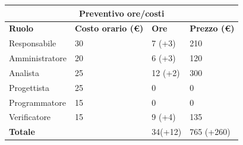 \documentclass[a4paper, 12pt]{article}
\begin{document}
\begin{center}
	\begin{tabularx}{\textwidth}{|X|X|X|X|}
		\hline
		\multicolumn{4}{|c|}{\textbf{Preventivo ore/costi}}                                      \\
		\hline
		\hline
		\textbf{Ruolo}  & \textbf{Costo orario (\euro)} & \textbf{Ore} & \textbf{Prezzo (\euro)} \\
		\hline
		Responsabile    & 30                            & 7 (+3)            & 210                     \\
		\hline
		Amministratore  & 20                            & 6 (+3)           & 120                     \\
		\hline
		Analista        & 25                            & 12 (+2)          & 300                     \\
		\hline
		Progettista     & 25                            & 0            & 0                       \\
		\hline
		Programmatore   & 15                            & 0            & 0                       \\
		\hline
		Verificatore    & 15                            & 9 (+4)          & 135                      \\
		\hline
		\hline
		\textbf{Totale} &                               & 34(+12)           &     765 (+260)                    \\
		\hline
	\end{tabularx}\\[8pt]
	\mbox{}\\
\end{center}
\end{document}
